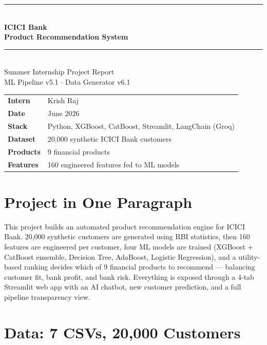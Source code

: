\documentclass[12pt,a4paper]{article}
\begin{document}
\begin{titlepage}\centering\vspace*{1.5cm}
{\color{iciciOrange}\rule{\linewidth}{3pt}}\\[0.4cm]
{\Huge\bfseries\color{darkblue}ICICI Bank\\[0.3cm]Product Recommendation System}\\[0.4cm]
{\color{iciciOrange}\rule{\linewidth}{3pt}}\\[0.8cm]
{\Large Summer Internship Project Report}\\[0.4cm]
{\large ML Pipeline v5.1 $\cdot$ Data Generator v6.1}\\[1.5cm]
\begin{tabular}{ll}
\textbf{Intern}   & Krish Raj \\[4pt]
\textbf{Date}     & June 2026 \\[4pt]
\textbf{Stack}    & Python, XGBoost, CatBoost, Streamlit, LangChain (Groq) \\[4pt]
\textbf{Dataset}  & 20{,}000 synthetic ICICI Bank customers \\[4pt]
\textbf{Products} & 9 financial products \\[4pt]
\textbf{Features} & 160 engineered features fed to ML models \\
\end{tabular}
\end{titlepage}

\tableofcontents\newpage

\section{Project in One Paragraph}

This project builds an automated product recommendation engine for ICICI Bank. 20{,}000 synthetic customers are generated using RBI statistics, then 160 features are engineered per customer, four ML models are trained (XGBoost + CatBoost ensemble, Decision Tree, AdaBoost, Logistic Regression), and a utility-based ranking decides which of 9 financial products to recommend — balancing customer fit, bank profit, and bank risk. Everything is exposed through a 4-tab Streamlit web app with an AI chatbot, new customer prediction, and a full pipeline transparency view.

\section{Data: 7 CSVs, 20{,}000 Customers}
\end{document}
